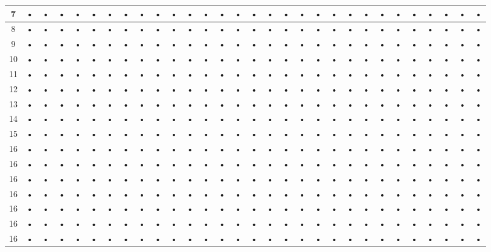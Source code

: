 \begin{landscape}
\begin{longtable}{|c|c|c|c|c|c|c|c|c|c|c|c|c|c|c|c|c|c|c|c|c|c|c|c|c|c|c|c|c|c|}
\hline 
7 & • & • & • & • & • & • & • & • & • & • & • & • & • & • & • & • & • & • & • & • & • & • & • & • & • & • & • & • & • \\
\hline 
8 & • & • & • & • & • & • & • & • & • & • & • & • & • & • & • & • & • & • & • & • & • & • & • & • & • & • & • & • & • \\
\hline 
9 & • & • & • & • & • & • & • & • & • & • & • & • & • & • & • & • & • & • & • & • & • & • & • & • & • & • & • & • & • \\
\hline 
10 & • & • & • & • & • & • & • & • & • & • & • & • & • & • & • & • & • & • & • & • & • & • & • & • & • & • & • & • & • \\
\hline 
11 & • & • & • & • & • & • & • & • & • & • & • & • & • & • & • & • & • & • & • & • & • & • & • & • & • & • & • & • & • \\
\hline 
12 & • & • & • & • & • & • & • & • & • & • & • & • & • & • & • & • & • & • & • & • & • & • & • & • & • & • & • & • & • \\
\hline 
13 & • & • & • & • & • & • & • & • & • & • & • & • & • & • & • & • & • & • & • & • & • & • & • & • & • & • & • & • & • \\
\hline 
14 & • & • & • & • & • & • & • & • & • & • & • & • & • & • & • & • & • & • & • & • & • & • & • & • & • & • & • & • & • \\
\hline 
15 & • & • & • & • & • & • & • & • & • & • & • & • & • & • & • & • & • & • & • & • & • & • & • & • & • & • & • & • & • \\
\hline 
16 & • & • & • & • & • & • & • & • & • & • & • & • & • & • & • & • & • & • & • & • & • & • & • & • & • & • & • & • & • \\
\hline 
16 & • & • & • & • & • & • & • & • & • & • & • & • & • & • & • & • & • & • & • & • & • & • & • & • & • & • & • & • & • \\
\hline
16 & • & • & • & • & • & • & • & • & • & • & • & • & • & • & • & • & • & • & • & • & • & • & • & • & • & • & • & • & • \\
\hline
16 & • & • & • & • & • & • & • & • & • & • & • & • & • & • & • & • & • & • & • & • & • & • & • & • & • & • & • & • & • \\
\hline
16 & • & • & • & • & • & • & • & • & • & • & • & • & • & • & • & • & • & • & • & • & • & • & • & • & • & • & • & • & • \\
\hline
16 & • & • & • & • & • & • & • & • & • & • & • & • & • & • & • & • & • & • & • & • & • & • & • & • & • & • & • & • & • \\
\hline
16 & • & • & • & • & • & • & • & • & • & • & • & • & • & • & • & • & • & • & • & • & • & • & • & • & • & • & • & • & • \\
\hline
\end{longtable}
\end{landscape}

